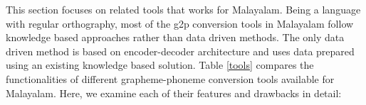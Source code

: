 \documentclass{ieeeaccess}
\begin{document}
This section focuses on related tools that works for Malayalam. Being a language with regular orthography, most of the  g2p conversion tools in Malayalam follow  knowledge based approaches \cite{duddington2012espeak,baby2016unified,parlikar2016festvox,aksharamukha,kunchukuttan2020indicnlp,manghat2020malayalam,aswathy2014improving} rather than data driven methods. 
The only data driven method is based on encoder-decoder architecture \cite{Priyamvada_2021} and uses data prepared using an existing knowledge based solution. Table \ref{tools} compares the functionalities of different grapheme-phoneme conversion tools available for Malayalam. Here, we examine each of their features and drawbacks in detail:
\end{document}
